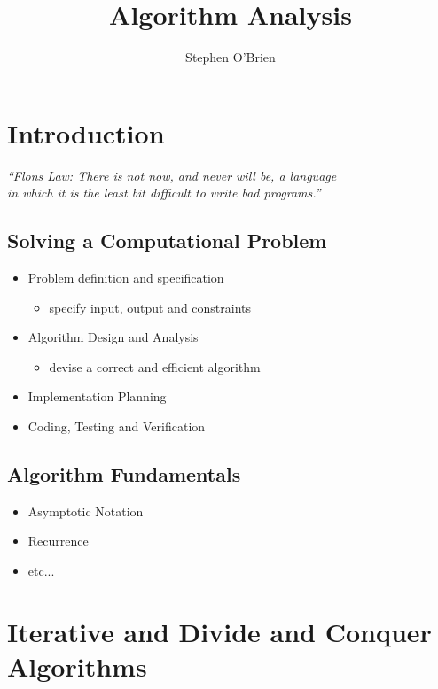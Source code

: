 \documentclass[11pt,a4paper]{report}
\title{Algorithm Analysis}
\author{Stephen O'Brien}
\begin{document}
	\maketitle
	\chapter{Introduction}
		\begin{center}
				\emph{
					``Flons Law: There is not now, and never will be, a language\\
					  in which it is the least bit difficult to write bad programs.''
				}
		\end{center}
		
		\section{Solving a Computational Problem}
			\begin{itemize}
			
				\item Problem definition and specification
					\begin{itemize}
						\item specify input, output and constraints
					\end{itemize}		
								
				\item Algorithm Design and Analysis
					\begin{itemize}
						\item devise a correct and efficient algorithm
					\end{itemize}				
					
				\item Implementation Planning
				
				\item Coding, Testing and Verification
			\end{itemize}			
			
		\section{Algorithm Fundamentals}
			\begin{itemize}
				\item Asymptotic Notation
				\item Recurrence
				\item etc...
			\end{itemize}
			
	\chapter{Iterative and Divide and Conquer Algorithms}
\end{document}
